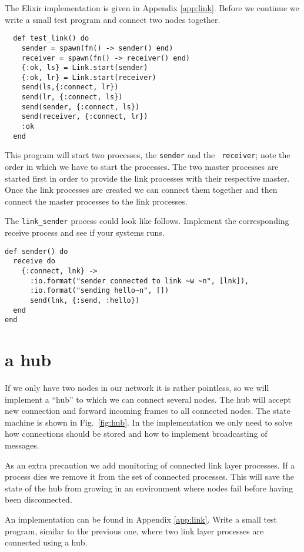 \documentclass[a4paper,11pt]{article}
\begin{document}
The Elixir implementation is given in Appendix \ref{app:link}. Before
we continue we write a small test program and connect two nodes
together.

\begin{verbatim}
  def test_link() do
    sender = spawn(fn() -> sender() end)
    receiver = spawn(fn() -> receiver() end)
    {:ok, ls} = Link.start(sender)
    {:ok, lr} = Link.start(receiver)
    send(ls,{:connect, lr})
    send(lr, {:connect, ls})
    send(sender, {:connect, ls})
    send(receiver, {:connect, lr})
    :ok
  end
\end{verbatim}

This program will start two processes, the {\tt sender} and the {\tt
  receiver};  note the order in which we have to start the
processes. The two master processes are started first in order to
provide the link processes with their respective master. Once the link
processes are created we can connect them together and then connect
the master processes to the link processes.

The {\tt link\_sender} process could look like follows. Implement the
corresponding receive process and see if your systems runs.

\begin{verbatim}
def sender() do
  receive do
    {:connect, lnk} ->
      :io.format("sender connected to link ~w ~n", [lnk]),
      :io.format("sending hello~n", [])
      send(lnk, {:send, :hello})
  end
end            
\end{verbatim}

\section{a hub}

If we only have two nodes in our network it is rather pointless, so we
will implement a ``hub'' to which we can connect several nodes. The
hub will accept new connection and forward incoming frames to all
connected nodes. The state machine is shown in Fig.~\ref{fig:hub}. In
the implementation we only need to solve how connections should be
stored and how to implement broadcasting of messages.

As an extra precaution we add monitoring of connected link layer processes. If a
process dies we remove it from the set of connected
processes. This will save the state of the hub from growing in an
environment where nodes fail before having been disconnected.

An implementation can be found in Appendix \ref{app:link}. Write a
small test program, similar to the previous one, where two link layer
processes are connected using a hub.
\end{document}
